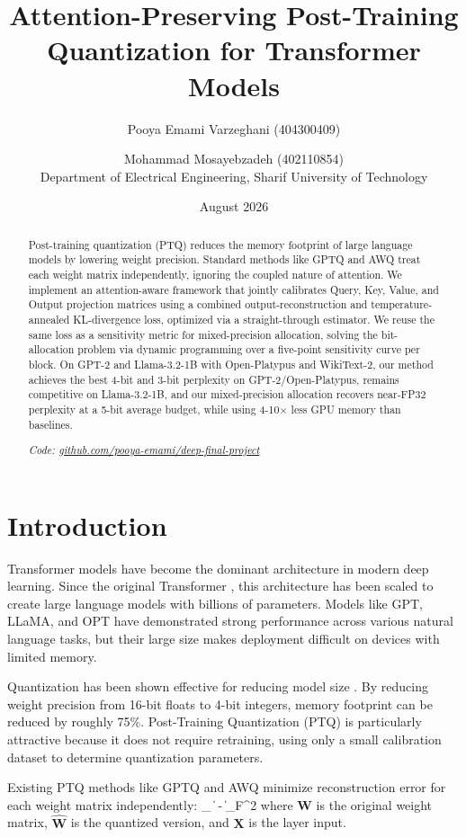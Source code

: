 \documentclass[10pt,twocolumn,letterpaper]{article}
\title{Attention-Preserving Post-Training Quantization for Transformer Models}
\author{Pooya Emami Varzeghani (404300409) \and Mohammad Mosayebzadeh (402110854) \\
Department of Electrical Engineering, Sharif University of Technology}
\date{August 2026}
\let\oldequation\equation
\let\oldendequation\endequation
\renewenvironment{equation}{\oldequation\small}{\oldendequation}
\begin{document}
\maketitle

\begin{abstract}
Post-training quantization (PTQ) reduces the memory footprint of large language models by lowering weight precision. Standard methods like GPTQ and AWQ treat each weight matrix independently, ignoring the coupled nature of attention. We implement an attention-aware framework that jointly calibrates Query, Key, Value, and Output projection matrices using a combined output-reconstruction and temperature-annealed KL-divergence loss, optimized via a straight-through estimator. We reuse the same loss as a sensitivity metric for mixed-precision allocation, solving the bit-allocation problem via dynamic programming over a five-point sensitivity curve per block. On GPT-2 and Llama-3.2-1B with Open-Platypus and WikiText-2, our method achieves the best 4-bit and 3-bit perplexity on GPT-2/Open-Platypus, remains competitive on Llama-3.2-1B, and our mixed-precision allocation recovers near-FP32 perplexity at a 5-bit average budget, while using 4-10$\times$ less GPU memory than baselines.

\noindent\textit{Code: \scriptsize \url{github.com/pooya-emami/deep-final-project}}
\end{abstract}

\section{Introduction}

Transformer models have become the dominant architecture in modern deep learning. Since the original Transformer \cite{vaswani2017attention}, this architecture has been scaled to create large language models with billions of parameters. Models like GPT, LLaMA, and OPT have demonstrated strong performance across various natural language tasks, but their large size makes deployment difficult on devices with limited memory.

Quantization has been shown effective for reducing model size \cite{gptq,lin2024awq}. By reducing weight precision from 16-bit floats to 4-bit integers, memory footprint can be reduced by roughly 75\%. Post-Training Quantization (PTQ) is particularly attractive because it does not require retraining, using only a small calibration dataset to determine quantization parameters.

Existing PTQ methods like GPTQ \cite{gptq} and AWQ \cite{lin2024awq} minimize reconstruction error for each weight matrix independently:
\begin{equation}
\min_{} \|  -  \|_F^2
\end{equation}
where $\mathbf{W}$ is the original weight matrix, $\hat{\mathbf{W}}$ is the quantized version, and $\mathbf{X}$ is the layer input.
\end{document}
